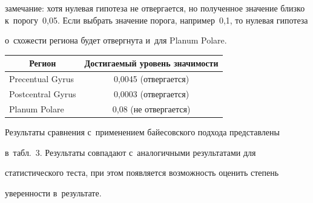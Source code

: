 замечание: хотя нулевая гипотеза не отвергается, но полученное значение близко к~порогу~0,05. Если выбрать значение порога, например~0,1, то нулевая гипотеза 

о~схожести региона будет отвергнута и~для Planum Polare. 

     

       \begin{table}[b]\small %

       \vspace*{-12pt}

       \begin{center}

       \parbox{240pt}{

}



      \vspace*{2ex}

      

      \begin{tabular}{|l|c|}

      \hline

\multicolumn{1}{|c|}{Регион}&Достигаемый уровень значимости\\

      \hline

Precentual Gyrus&0,0045 (отвергается)\\

Postcentral Gyrus&0,0003 (отвергается)\\

Planum Polare&0,08 (не отвергается)\\

      \hline

      \end{tabular}

      \end{center}

      \end{table}

      

     Результаты сравнения с~применением байесовского подхода представлены 

в~табл.~3. Результаты совпадают с~аналогичными результатами для 

статистического теста, при этом появляется возможность оценить степень 

уверенности в~результате. 

